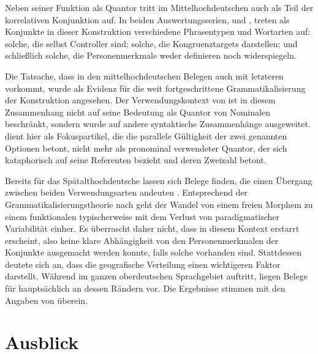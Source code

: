 Neben seiner Funktion als Quantor tritt  im Mittelhochdeutschen
auch als Teil der korrelativen Konjunktion 
 auf. In beiden Auswertungs\-serien,
\CAO{} und \KC{}, treten als Konjunkte in dieser Konstruktion
verschiedene Phrasen\-typen und Wort\-arten auf: solche, die selbst Controller
sind; solche, die Kongruenztargets darstellen; und schließlich solche, die
Personenmerkmale weder definieren noch widerspiegeln.

Die Tatsache, dass  in den mittelhochdeutschen Belegen auch mit
letzteren vorkommt, wurde als Evidenz für die weit fortgeschrittene
Grammatikalisierung der Konstruktion angesehen. Der Verwendungskontext von
 ist in diesem Zusammenhang nicht auf seine Bedeutung als Quantor
von Nominalen beschränkt, sondern wurde auf andere syntaktische Zusammenhänge
ausgeweitet.  dient hier als Fokuspartikel, die die parallele
Gültigkeit der zwei genannten Optionen betont, nicht mehr als pronominal
verwendeter Quantor, der sich kataphorisch auf seine Referenten bezieht und
deren Zweizahl betont.

Bereits für das Spätalthochdeutsche lassen sich Belege finden, die einen
Übergang zwischen beiden Verwendungsarten andeuten \autocite[vgl.\ die
Beispiele in][627]{ksw2}. Entsprechend der Grammatikalisierungstheorie nach
\citet[146--150]{lehmann2015} geht der Wandel von einem freien Morphem zu einem
funktionalen typischerweise mit dem Verlust von paradigmatischer Variabilität
einher. Es überrascht daher nicht, dass  in diesem Kontext
erstarrt erscheint, also keine klare Abhängigkeit von den Personenmerkmalen der
Konjunkte ausgemacht werden konnte, falls solche vorhanden sind. Stattdessen
deutete sich an, dass die geografische Verteilung einen wichtigeren Faktor
darstellt. Während  im ganzen oberdeutschen Sprachgebiet auftritt,
liegen Belege für  hauptsächlich an dessen Rändern vor. Die
Ergebnisse stimmen mit den Angaben von \citet[627--628]{ksw2} überein.

\section{Ausblick}

